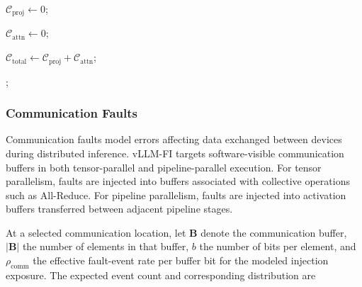 \begin{algorithm}[t]
\footnotesize
\DontPrintSemicolon
\SetAlgoVlined
\SetInd{0.35em}{0.75em}
\caption{Runtime MAC Estimation}
\label{alg:mac_estimation}

$\mathcal{C}_{\mathrm{proj}} \leftarrow 0$;


$\mathcal{C}_{\mathrm{attn}} \leftarrow 0$;


$\mathcal{C}_{\mathrm{total}}
\leftarrow
\mathcal{C}_{\mathrm{proj}}
+
\mathcal{C}_{\mathrm{attn}}$;

;
\end{algorithm}


\subsubsection{Communication Faults}

Communication faults model errors affecting data exchanged between devices during distributed inference. vLLM-FI targets software-visible communication buffers in both tensor-parallel and pipeline-parallel execution. For tensor parallelism, faults are injected into buffers associated with collective operations such as All-Reduce. For pipeline parallelism, faults are injected into activation buffers transferred between adjacent pipeline stages.

At a selected communication location, let $\mathbf{B}$ denote the communication buffer, $|\mathbf{B}|$ the number of elements in that buffer, $b$ the number of bits per element, and $\rho_{\mathrm{comm}}$ the effective fault-event rate per buffer bit for the modeled injection exposure. The expected event count and corresponding distribution are

